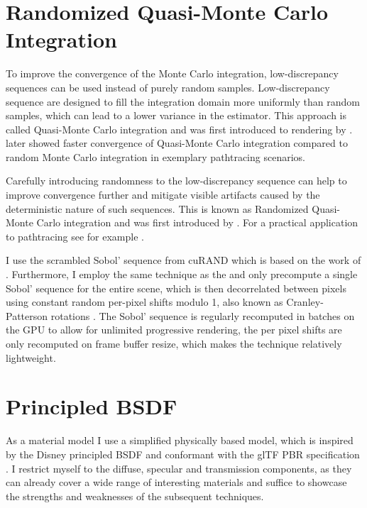\section{Randomized Quasi-Monte Carlo Integration}

To improve the convergence of the Monte Carlo integration, low-discrepancy sequences can be used instead of purely random samples.
Low-discrepancy sequence are designed to fill the integration domain more uniformly than random samples, which can lead to a lower variance in the estimator.
This approach is called Quasi-Monte Carlo integration and was first introduced to rendering by \textcite{heinrich1994a}.
\textcite{keller1996a} later showed faster convergence of Quasi-Monte Carlo integration compared to random Monte Carlo integration in exemplary pathtracing scenarios.

Carefully introducing randomness to the low-discrepancy sequence can help to improve convergence further and mitigate visible artifacts caused by the deterministic nature of such sequences.
This is known as Randomized Quasi-Monte Carlo integration and was first introduced by \textcite{owen1995}.
For a practical application to pathtracing see for example \textcite{burley2020}.

I use the scrambled Sobol' sequence from cuRAND  which is based on the work of \textcite{owen2008}.
Furthermore, I employ the same technique as the \textcite{blenderfoundation} and only precompute a single Sobol' sequence for the entire scene, which is then decorrelated between pixels using constant random per-pixel shifts modulo 1, also known as Cranley-Patterson rotations .
The Sobol' sequence is regularly recomputed in batches on the GPU to allow for unlimited progressive rendering, the per pixel shifts are only recomputed on frame buffer resize, which makes the technique relatively lightweight.

\section{Principled BSDF}

As a material model I use a simplified physically based model, which is inspired by the Disney principled BSDF  and conformant with the glTF PBR specification .
I restrict myself to the diffuse, specular and transmission components, as they can already cover a wide range of interesting materials and suffice to showcase the strengths and weaknesses of the subsequent techniques.

